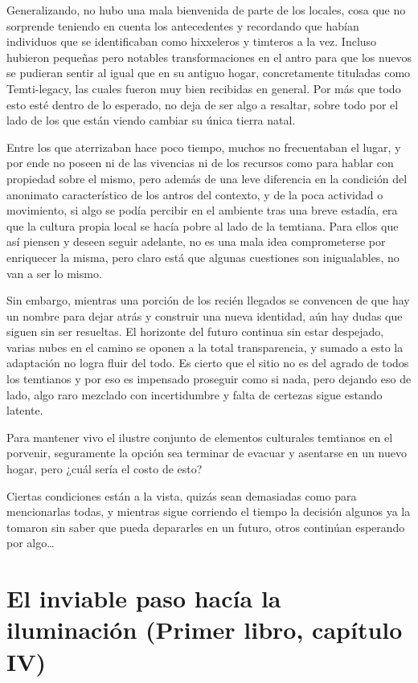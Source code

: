 \documentclass[
]{book}
\begin{document}
Generalizando, no hubo una mala bienvenida de parte de los locales, cosa que no sorprende teniendo en cuenta los antecedentes y recordando que habían individuos que se identificaban como hixxeleros y timteros a la vez. Incluso hubieron pequeñas pero notables transformaciones en el antro para que los nuevos se pudieran sentir al igual que en su antiguo hogar, concretamente tituladas como Temti-legacy, las cuales fueron muy bien recibidas en general. Por más que todo esto esté dentro de lo esperado, no deja de ser algo a resaltar, sobre todo por el lado de los que están viendo cambiar su única tierra natal.

Entre los que aterrizaban hace poco tiempo, muchos no frecuentaban el lugar, y por ende no poseen ni de las vivencias ni de los recursos como para hablar con propiedad sobre el mismo, pero además de una leve diferencia en la condición del anonimato característico de los antros del contexto, y de la poca actividad o movimiento, si algo se podía percibir en el ambiente tras una breve estadía, era que la cultura propia local se hacía pobre al lado de la temtiana. Para ellos que así piensen y deseen seguir adelante, no es una mala idea comprometerse por enriquecer la misma, pero claro está que algunas cuestiones son inigualables, no van a ser lo mismo.

Sin embargo, mientras una porción de los recién llegados se convencen de que hay un nombre para dejar atrás y construir una nueva identidad, aún hay dudas que siguen sin ser resueltas. El horizonte del futuro continua sin estar despejado, varias nubes en el camino se oponen a la total transparencia, y sumado a esto la adaptación no logra fluir del todo. Es cierto que el sitio no es del agrado de todos los temtianos y por eso es impensado proseguir como si nada, pero dejando eso de lado, algo raro mezclado con incertidumbre y falta de certezas sigue estando latente.

Para mantener vivo el ilustre conjunto de elementos culturales temtianos en el porvenir, seguramente la opción sea terminar de evacuar y asentarse en un nuevo hogar, pero ¿cuál sería el costo de esto?

Ciertas condiciones están a la vista, quizás sean demasiadas como para mencionarlas todas, y mientras sigue corriendo el tiempo la decisión algunos ya la tomaron sin saber que pueda depararles en un futuro, otros continúan esperando por algo\ldots{}

\hypertarget{el-inviable-paso-hacuxeda-la-iluminaciuxf3n-primer-libro-capuxedtulo-iv}{%
\section{El inviable paso hacía la iluminación (Primer libro, capítulo IV)}\label{el-inviable-paso-hacuxeda-la-iluminaciuxf3n-primer-libro-capuxedtulo-iv}}
\end{document}
